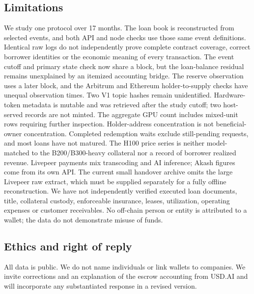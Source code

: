 \subsection{Limitations}
We study one protocol over 17 months. The loan book is reconstructed from selected events, and both API and node checks use those same event definitions. Identical raw logs do not independently prove complete contract coverage, correct borrower identities or the economic meaning of every transaction. The event cutoff and primary state check now share a block, but the \LoanBookGap{} loan-balance residual remains unexplained by an itemized accounting bridge. The reserve observation uses a later block, and the Arbitrum and Ethereum holder-to-supply checks have unequal observation times. Two V1 topic hashes remain unidentified. Hardware-token metadata is mutable and was retrieved after the study cutoff; two host-served records are not minted. The aggregate GPU count includes mixed-unit rows requiring further inspection. Holder-address concentration is not beneficial-owner concentration. Completed redemption waits exclude still-pending requests, and most loans have not matured. The H100 price series is neither model-matched to the B200/B300-heavy collateral nor a record of borrower realized revenue. Livepeer payments mix transcoding and AI inference; Akash figures come from its own API. The current small handover archive omits the large Livepeer raw extract, which must be supplied separately for a fully offline reconstruction. We have not independently verified executed loan documents, title, collateral custody, enforceable insurance, leases, utilization, operating expenses or customer receivables. No off-chain person or entity is attributed to a wallet; the data do not demonstrate misuse of funds.

\subsection{Ethics and right of reply}
All data is public. We do not name individuals or link wallets to companies. We invite corrections and an explanation of the escrow accounting from USD.AI and will incorporate any substantiated response in a revised version.

